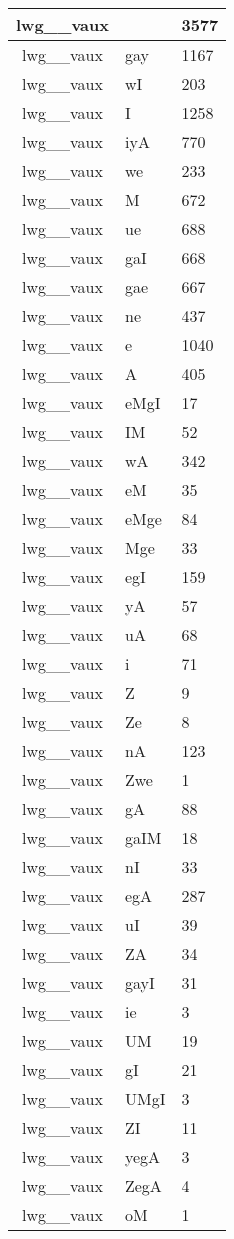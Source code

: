 \documentclass[a4 paper]{article}
\begin{document}
\begin{longtable}{cp{}p{}}
lwg\_\_vaux &  & 3577\\ \midrule lwg\_\_vaux & gay & 1167\\ \midrule lwg\_\_vaux & wI & 203\\ \midrule lwg\_\_vaux & I & 1258\\ \midrule lwg\_\_vaux & iyA & 770\\ \midrule lwg\_\_vaux & we & 233\\ \midrule lwg\_\_vaux & M & 672\\ \midrule lwg\_\_vaux & ue & 688\\ \midrule lwg\_\_vaux & gaI & 668\\ \midrule lwg\_\_vaux & gae & 667\\ \midrule lwg\_\_vaux & ne & 437\\ \midrule lwg\_\_vaux & e & 1040\\ \midrule lwg\_\_vaux & A & 405\\ \midrule lwg\_\_vaux & eMgI & 17\\ \midrule lwg\_\_vaux & IM & 52\\ \midrule lwg\_\_vaux & wA & 342\\ \midrule lwg\_\_vaux & eM & 35\\ \midrule lwg\_\_vaux & eMge & 84\\ \midrule lwg\_\_vaux & Mge & 33\\ \midrule lwg\_\_vaux & egI & 159\\ \midrule lwg\_\_vaux & yA & 57\\ \midrule lwg\_\_vaux & uA & 68\\ \midrule lwg\_\_vaux & i & 71\\ \midrule lwg\_\_vaux & Z & 9\\ \midrule lwg\_\_vaux & Ze & 8\\ \midrule lwg\_\_vaux & nA & 123\\ \midrule lwg\_\_vaux & Zwe & 1\\ \midrule lwg\_\_vaux & gA & 88\\ \midrule lwg\_\_vaux & gaIM & 18\\ \midrule lwg\_\_vaux & nI & 33\\ \midrule lwg\_\_vaux & egA & 287\\ \midrule lwg\_\_vaux & uI & 39\\ \midrule lwg\_\_vaux & ZA & 34\\ \midrule lwg\_\_vaux & gayI & 31\\ \midrule lwg\_\_vaux & ie & 3\\ \midrule lwg\_\_vaux & UM & 19\\ \midrule lwg\_\_vaux & gI & 21\\ \midrule lwg\_\_vaux & UMgI & 3\\ \midrule lwg\_\_vaux & ZI & 11\\ \midrule lwg\_\_vaux & yegA & 3\\ \midrule lwg\_\_vaux & ZegA & 4\\ \midrule lwg\_\_vaux & oM & 1\\ \midrule 
\end{longtable}
\end{document}
